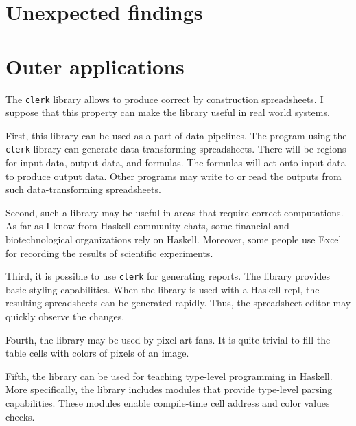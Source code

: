 \section{Unexpected findings}
\label{eval:unexpected}

\section{Outer applications}
\label{eval:outer-applications}

The \texttt{clerk} library allows to produce correct by construction spreadsheets.
I suppose that this property can make the library useful in real world systems.

First, this library can be used as a part of data pipelines.
The program using the \texttt{clerk} library can generate data-transforming spreadsheets.
There will be regions for input data, output data, and formulas.
The formulas will act onto input data to produce output data.
Other programs may write to or read the outputs from such data-transforming spreadsheets.

Second, such a library may be useful in areas that require correct computations.
As far as I know from Haskell community chats, some financial and biotechnological organizations rely on Haskell.
Moreover, some people use Excel for recording the results of scientific experiments.

Third, it is possible to use \texttt{clerk} for generating reports.
The library provides basic styling capabilities.
When the library is used with a Haskell repl, the resulting spreadsheets can be generated rapidly.
Thus, the spreadsheet editor may quickly observe the changes.

Fourth, the library may be used by pixel art fans.
It is quite trivial to fill the table cells with colors of pixels of an image.

Fifth, the library can be used for teaching type-level programming in Haskell.
More specifically, the library includes modules that provide type-level parsing capabilities.
These modules enable compile-time cell address and color values checks.


